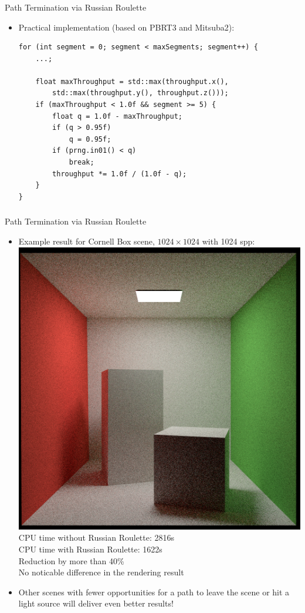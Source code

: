 \documentclass[utf8,stillsansserifmath,fleqn,t]{beamer}
\begin{document}
\begin{frame}[fragile]
\frametitle{\insertsection}
Path Termination via Russian Roulette
\begin{itemize}
\item Practical implementation (based on PBRT3 and Mitsuba2):
\begin{lstlisting}
for (int segment = 0; segment < maxSegments; segment++) {
    ...;

    float maxThroughput = std::max(throughput.x(),
        std::max(throughput.y(), throughput.z()));
    if (maxThroughput < 1.0f && segment >= 5) {
        float q = 1.0f - maxThroughput;
        if (q > 0.95f)
            q = 0.95f;
        if (prng.in01() < q)
            break;
        throughput *= 1.0f / (1.0f - q);
    }
}
\end{lstlisting}
\end{itemize}
\end{frame}

\begin{frame}[label=rr-4]
\frametitle{\insertsection}
Path Termination via Russian Roulette
\begin{itemize}
\item Example result for Cornell Box scene, $1024\times 1024$ with 1024 spp:\\
    \includegraphics[width=.3\textwidth]{./fig/pathtracer-result-05-2.png}\\
    CPU time without Russian Roulette: 2816s\\
    CPU time with    Russian Roulette: 1622s\\
    Reduction by more than 40\%\\
    No noticable difference in the rendering result
\item Other scenes with fewer opportunities for a path to leave the scene
or hit a light source will deliver even better results!
\end{itemize}
\end{frame}
\end{document}
